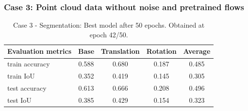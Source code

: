\subsubsection{Case 3: Point cloud data without noise and pretrained flows}
\begin{table}[H]
    \begin{center}
        \begin{tabular}{|l||c|c|c|c|}
            \hline
            Evaluation metrics & Base & Translation & Rotation & Average \\
            \hline \hline
            train accuracy & 0.588 & 0.680 & 0.187 & 0.485 \\
            \hline
            train IoU & 0.352 & 0.419 & 0.145 & 0.305 \\
            \hline
            test accuracy & 0.613 & 0.666 & 0.208 & 0.496 \\
            \hline
            test IoU & 0.385 & 0.429 & 0.154 & 0.323 \\
            \hline
        \end{tabular}
    \end{center}
    \caption{Case 3 - Segmentation: Best model after 50 epochs. Obtained at epoch 42/50.}
\end{table}
